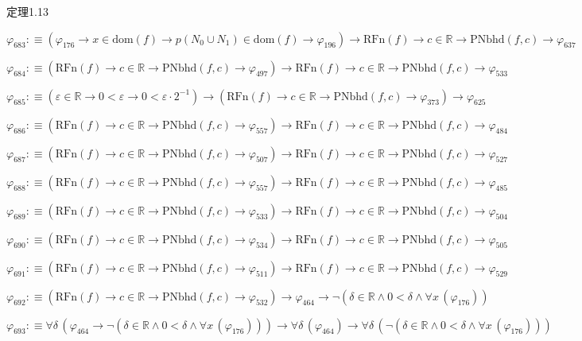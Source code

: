 \begin{fullproof}{定理1.13}
\begin{abbrevlist}
\item $\varphi_{683} :\equiv (\varphi_{176} \to x \in \mathrm{dom}(f) \to p(N_{0} \cup N_{1}) \in \mathrm{dom}(f) \to \varphi_{196}) \to \mathrm{RFn}(f) \to c \in \mathbb{R} \to \mathrm{PNbhd}(f,c) \to \varphi_{637}$
\item $\varphi_{684} :\equiv (\mathrm{RFn}(f) \to c \in \mathbb{R} \to \mathrm{PNbhd}(f,c) \to \varphi_{497}) \to \mathrm{RFn}(f) \to c \in \mathbb{R} \to \mathrm{PNbhd}(f,c) \to \varphi_{533}$
\item $\varphi_{685} :\equiv (\varepsilon \in \mathbb{R} \to 0 < \varepsilon \to 0 < \varepsilon \cdot 2^{-1}) \to (\mathrm{RFn}(f) \to c \in \mathbb{R} \to \mathrm{PNbhd}(f,c) \to \varphi_{373}) \to \varphi_{625}$
\item $\varphi_{686} :\equiv (\mathrm{RFn}(f) \to c \in \mathbb{R} \to \mathrm{PNbhd}(f,c) \to \varphi_{557}) \to \mathrm{RFn}(f) \to c \in \mathbb{R} \to \mathrm{PNbhd}(f,c) \to \varphi_{484}$
\item $\varphi_{687} :\equiv (\mathrm{RFn}(f) \to c \in \mathbb{R} \to \mathrm{PNbhd}(f,c) \to \varphi_{507}) \to \mathrm{RFn}(f) \to c \in \mathbb{R} \to \mathrm{PNbhd}(f,c) \to \varphi_{527}$
\item $\varphi_{688} :\equiv (\mathrm{RFn}(f) \to c \in \mathbb{R} \to \mathrm{PNbhd}(f,c) \to \varphi_{557}) \to \mathrm{RFn}(f) \to c \in \mathbb{R} \to \mathrm{PNbhd}(f,c) \to \varphi_{485}$
\item $\varphi_{689} :\equiv (\mathrm{RFn}(f) \to c \in \mathbb{R} \to \mathrm{PNbhd}(f,c) \to \varphi_{533}) \to \mathrm{RFn}(f) \to c \in \mathbb{R} \to \mathrm{PNbhd}(f,c) \to \varphi_{504}$
\item $\varphi_{690} :\equiv (\mathrm{RFn}(f) \to c \in \mathbb{R} \to \mathrm{PNbhd}(f,c) \to \varphi_{534}) \to \mathrm{RFn}(f) \to c \in \mathbb{R} \to \mathrm{PNbhd}(f,c) \to \varphi_{505}$
\item $\varphi_{691} :\equiv (\mathrm{RFn}(f) \to c \in \mathbb{R} \to \mathrm{PNbhd}(f,c) \to \varphi_{511}) \to \mathrm{RFn}(f) \to c \in \mathbb{R} \to \mathrm{PNbhd}(f,c) \to \varphi_{529}$
\item $\varphi_{692} :\equiv (\mathrm{RFn}(f) \to c \in \mathbb{R} \to \mathrm{PNbhd}(f,c) \to \varphi_{532}) \to \varphi_{464} \to \neg (\delta \in \mathbb{R} \land 0 < \delta \land \forall x\,(\varphi_{176}))$
\item $\varphi_{693} :\equiv \forall \delta\,(\varphi_{464} \to \neg (\delta \in \mathbb{R} \land 0 < \delta \land \forall x\,(\varphi_{176}))) \to \forall \delta\,(\varphi_{464}) \to \forall \delta\,(\neg (\delta \in \mathbb{R} \land 0 < \delta \land \forall x\,(\varphi_{176})))$

\end{abbrevlist}
\end{fullproof}
